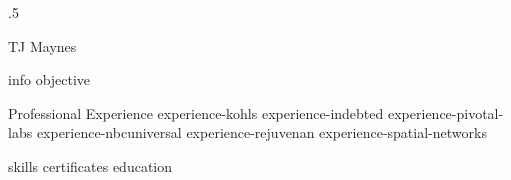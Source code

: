 \documentclass[10pt]{article}
\begin{document}
\moveleft.5\hoffset\centerline{\huge TJ Maynes}
{info}
{objective}
\begin{section}{Professional Experience}
  {experience-kohls}
  {experience-indebted}
  {experience-pivotal-labs}
  {experience-nbcuniversal}
  {experience-rejuvenan}
  {experience-spatial-networks}
\end{section}
{skills}
{certificates}
{education}
\end{document}
